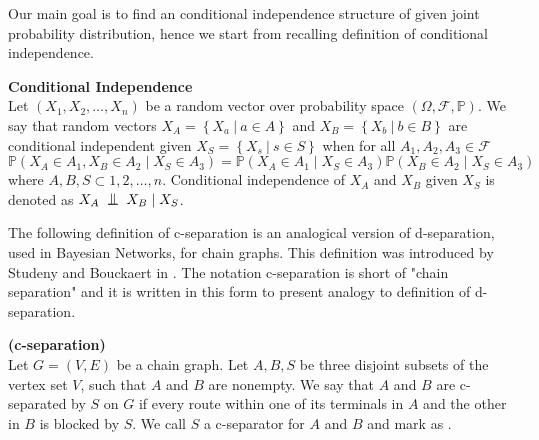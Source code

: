 
%
Our main goal is to find an conditional independence structure of given joint probability distribution, hence we start from recalling definition of conditional independence.

\begin{defi} \label{condInd} {\textbf{Conditional Independence}} \\
	Let $(X_1, X_2, \dots, X_n)$ be a random vector over probability space $(\Omega, \mathcal{F}, \mathbb{P})$.
	We say that random vectors $X_A = \left\{ X_a  \ | \ a \in A \right\}$ and 
	$X_B = \left\{ X_b  \ | \ b \in B \right\}$
	are conditional independent given $X_S = \left\{ X_s  \ | \ s \in S \right\}$ when 
	for all $A_1, A_2, A_3 \in \mathcal{F}$
	\begin{equation} 
		\mathbb{P}(X_A \in A_1, X_B \in A_2 \mid X_S \in A_3) = \mathbb{P}(X_A \in A_1 \mid X_S \in A_3) 													\mathbb{P}(X_B \in A_2 \mid X_S \in A_3)
	\end{equation}
	where $A, B, S \subset {1, 2, \dots, n}$. Conditional independence of $X_A$ and $X_B$
	given $X_S$ is denoted as $X_A \bigCI X_B \mid X_S$.
\end{defi}
The following definition of c-separation is an analogical version of d-separation, used in Bayesian Networks, for chain graphs. This definition was introduced by Studeny and Bouckaert in \cite{OCG}. The notation c-separation is short of "chain separation" and it is written in this form to present analogy to definition of d-separation.


\begin{defi} \label{cSepDef} {\textbf{(c-separation)}} \\
	Let $G = (V, E)$ be a chain graph. Let $A, B, S$ be three disjoint subsets of the vertex set $V$, such that
	$A$ and $B$ are nonempty. We say that $A$ and $B$ are c-separated by $S$ on $G$ if every route within one of 
	its terminals in $A$ and the other in $B$ is blocked by $S$. 
	We call $S$ a c-separator for $A$ and $B$ and mark as .
\end{defi}


